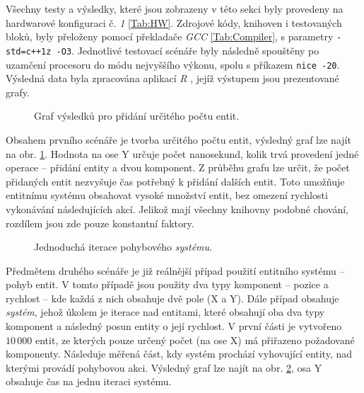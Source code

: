 Všechny testy a výsledky, které jsou zobrazeny v této sekci byly provedeny na hardwarové konfiguraci č. \emph{1} \ref{Tab:HW}. Zdrojové kódy, knihoven i testovaných bloků, byly přeloženy pomocí překladače \emph{GCC} \ref{Tab:Compiler}, s parametry \texttt{-std=c++1z -O3}. Jednotlivé testovací scénáře byly následně spouštěny po uzamčení procesoru do módu nejvyššího výkonu, spolu s příkazem \texttt{nice -20}. Výsledná data byla zpracována aplikací \emph{R} \cite{RHome}, jejíž výstupem jsou prezentované grafy.

\begin{figure}[H]
	\begin{center}
	\end{center}
	\caption{Graf výsledků pro přidání určitého počtu entit.}
	\label{Fig:EVALEntity}
\end{figure}

Obsahem prvního scénáře je tvorba určitého počtu entit, výsledný graf lze najít na obr. \ref{Fig:EVALEntity}. Hodnota na ose Y určuje počet nanosekund, kolik trvá provedení jedné operace -- přidání entity a dvou komponent. Z průběhu grafu lze určit, že počet přidaných entit nezvyšuje čas potřebný k přidání dalších entit. Toto umožňuje entitnímu systému obsahovat vysoké množství entit, bez omezení rychlosti vykonávání následujících akcí. Jelikož mají všechny knihovny podobné chování, rozdílem jsou zde pouze konstantní faktory.

\begin{figure}[H]
	\begin{center}
	\end{center}
	\caption{Jednoduchá iterace pohybového \emph{systému}.}
	\label{Fig:EVALMovSys}
\end{figure}

Předmětem druhého scénáře je již reálnější případ použití entitního systému -- pohyb entit. V tomto případě jsou použity dva typy komponent -- pozice a rychlost -- kde každá z nich obsahuje dvě pole (X a Y). Dále případ obsahuje \emph{systém}, jehož úkolem je iterace nad entitami, které obsahují oba dva typy komponent a následný posun entity o její rychlost. V první části je vytvořeno $10\,000$ entit, ze kterých pouze určený počet (na ose X) má přiřazeno požadované komponenty. Následuje měřená část, kdy systém prochází vyhovující entity, nad kterými provádí pohybovou akci. Výsledný graf lze najít na obr. \ref{Fig:EVALMovSys}, osa Y obsahuje čas na jednu iteraci systému.

